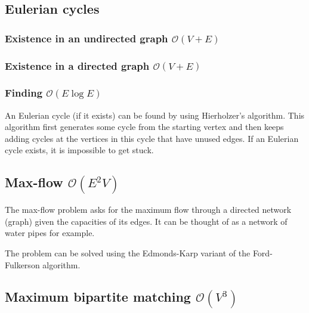 \subsection{Eulerian cycles}

\subsubsection{Existence in an undirected graph $\mathcal O(V + E)$}

\subsubsection{Existence in a directed graph $\mathcal O(V + E)$}

\subsubsection{Finding $\mathcal O(E\log E)$}
An Eulerian cycle (if it exists) can be found by using Hierholzer's algorithm. This algorithm first generates some cycle from the starting vertex and then keeps adding cycles at the vertices in this cycle that have unused edges. If an Eulerian cycle exists, it is impossible to get stuck.



\subsection{Max-flow $\mathcal O(E^2V)$}

The max-flow problem asks for the maximum flow through a directed network (graph) given the capacities of its edges. It can be thought of as a network of water pipes for example.

The problem can be solved using the Edmonds-Karp variant of the Ford-Fulkerson algorithm.



\subsection{Maximum bipartite matching $\mathcal O(V^3)$}

